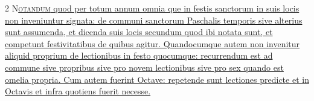 \begin{multicols*}{2}
{\color{Red} }
\lettrine[lines=2]{\zallmancaps \color{Red} N}{}\ul{\textsc{otandum} quod per totum annum omnia que in festis sanctorum in suis locis non inveniuntur signata: de communi sanctorum Paschalis temporis sive alterius sunt assumenda, et dicenda suis locis secundum quod ibi notata sunt, et competunt festivitatibus de quibus agitur. Quandocumque autem non invenitur aliquid proprium de lectionibus in festo quocumque: recurrendum est ad commune sive propribus sive pro novem lectionibus sive pro sex quando est omelia propria. Cum autem fuerint Octave: repetende sunt lectiones predicte et in Octavis et infra quotiens fuerit necesse.}



\end{multicols*}
